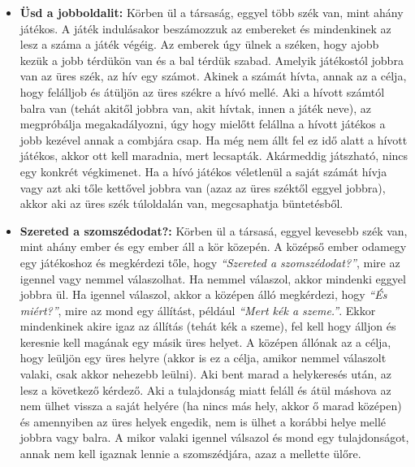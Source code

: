 \documentclass[a4paper, 12pt, twoside, openright]{article}
\begin{document}
\begin{itemize}
\item \textbf{Üsd a jobboldalit:} Körben ül a társaság, eggyel több szék van, mint ahány játékos. A játék indulásakor beszámozzuk az embereket és mindenkinek az lesz a száma a játék végéig. Az emberek úgy ülnek a széken, hogy ajobb kezük a jobb térdükön van és a bal térdük szabad. Amelyik játékostól jobbra van az üres szék, az hív egy számot. Akinek a számát hívta, annak az a célja, hogy felálljob és átüljön az üres székre a hívó mellé. Aki a hívott számtól balra van (tehát akitől jobbra van, akit hívtak, innen a játék neve), az megpróbálja megakadályozni, úgy hogy mielőtt felállna a hívott játékos a jobb kezével annak a combjára csap. Ha még nem állt fel ez idő alatt a hívott játékos, akkor ott kell maradnia, mert lecsapták. Akármeddig játszható, nincs egy konkrét végkimenet. Ha a hívó játékos véletlenül a saját számát hívja vagy azt aki tőle kettővel jobbra van (azaz az üres széktől eggyel jobbra), akkor aki az üres szék túloldalán van, megcsaphatja büntetésből.

\item \textbf{Szereted a szomszédodat?:} Körben ül a társasá, eggyel kevesebb szék van, mint ahány ember és egy ember áll a kör közepén. A középső ember odamegy egy játékoshoz és megkérdezi tőle, hogy \emph{``Szereted a szomszédodat?''}, mire az igennel vagy nemmel válaszolhat. Ha nemmel válaszol, akkor mindenki eggyel jobbra ül. Ha igennel válaszol, akkor a középen álló megkérdezi, hogy \emph{``És miért?''}, mire az mond egy állítást, például \emph{``Mert kék a szeme.''}. Ekkor mindenkinek akire igaz az állítás (tehát kék a szeme), fel kell hogy álljon és keresnie kell magának egy másik üres helyet. A középen állónak az a célja, hogy leüljön egy üres helyre (akkor is ez a célja, amikor nemmel válaszolt valaki, csak akkor nehezebb leülni). Aki bent marad a helykeresés után, az lesz a következő kérdező. Aki a tulajdonság miatt feláll és átül máshova az nem ülhet vissza a saját helyére (ha nincs más hely, akkor ő marad középen) és amennyiben az üres helyek engedik, nem is ülhet a korábbi helye mellé jobbra vagy balra. A mikor valaki igennel válsazol és mond egy tulajdonságot, annak nem kell igaznak lennie a szomszédjára, azaz a mellette ülőre.


\end{itemize}
\end{document}
